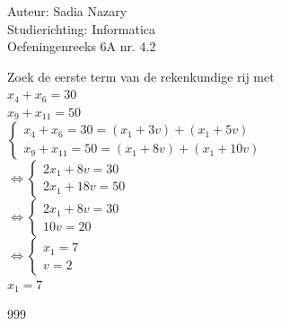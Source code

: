 \documentclass[a4paper]{article}
\begin{document}
\noindent \large Auteur: Sadia Nazary \\
\noindent \large Studierichting: Informatica\\
\noindent \large Oefeningenreeks 6A nr. 4.2\\

\medskip

\normalsize

Zoek de eerste term van de rekenkundige rij met \\

$ x_{4} + x_{6} = 30 $ \\

$ x_{9} + x_{11} = 50 $ \\

$ \left\{
\begin{array}{l}
    x_{4} + x_{6} = 30 = (x_{1} + 3v) + (x_{1} + 5v) \\
    x_{9} + x_{11} = 50 = (x_{1} + 8v) + (x_{1} + 10v)
\end{array}
\right.$ \\

$\Leftrightarrow \left\{
\begin{array}{l}
    2x_{1} + 8v = 30 \\
    2x_{1} + 18v = 50 
\end{array}
\right.$ \\

$\Leftrightarrow \left\{
\begin{array}{l}
    2x_{1} + 8v = 30 \\
    10v = 20
\end{array}
\right.$ \\

$\Leftrightarrow \left\{
\begin{array}{l}
    x_{1} = 7 \\
    v = 2
\end{array}
\right.$ \\

$ x_{1} = 7 $ \\

\begin{thebibliography}{999}
\end{thebibliography}
\end{document}
